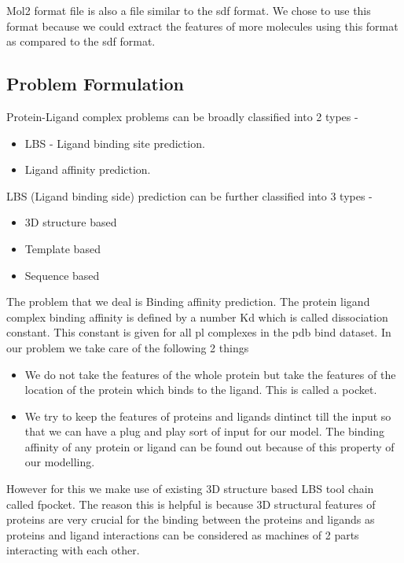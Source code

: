 \documentclass[11pt]{article}
\begin{document}
Mol2 format file is also a file similar to the sdf format.
We chose to use this format because we could extract the features of more molecules
using this format as compared to the sdf format.


\subsection{Problem Formulation}
Protein-Ligand complex problems can be broadly classified into 2 types -
\begin{itemize}
\item LBS - Ligand binding site prediction.
\item Ligand affinity prediction.
\end{itemize} 

LBS (Ligand binding side) prediction can be further classified into 3 types -
\begin{itemize}
\item 3D structure based
\item Template based
\item Sequence based
\end{itemize}

The problem that we deal is Binding affinity prediction. 
The protein ligand complex binding affinity is defined by a number Kd which is called dissociation constant.
This constant is given for all pl complexes in the pdb bind dataset.
In our problem we take care of the following 2 things
\begin{itemize}
\item We do not take the features of the whole protein
but take the features of the location of the protein which binds to the ligand.
This is called a pocket.
\item We try to keep the features of proteins and ligands dintinct till the input so that we can have a plug and play sort of input for our model.
The binding affinity of any protein or ligand can be found out because of this property of our modelling.
\end{itemize}

However for this we make use of existing 3D structure based LBS tool chain called fpocket.
The reason this is helpful is because 3D structural features of proteins are very crucial for the binding between 
the proteins and ligands as proteins and ligand interactions can be considered as
machines of 2 parts interacting with each other.
\end{document}
